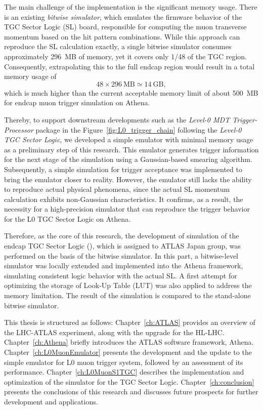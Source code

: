 The main challenge of the implementation is the significant memory usage. There is an existing \textit{bitwise simulator}, which emulates the firmware behavior of the TGC Sector Logic (SL) board, responsible for computing the muon transverse momentum based on the hit pattern combinations. While this approach can reproduce the SL calculation exactly, a single bitwise simulator consumes approximately 296~MB of memory, yet it covers only 1/48 of the TGC region. Consequently, extrapolating this to the full endcap region would result in a total memory usage of
\[
48 \times 296~\text{MB} \simeq 14~\text{GB},
\]
which is much higher than the current acceptable memory limit of about 500~MB for endcap muon trigger simulation on Athena.

Thereby, to support downstream developments such as the \textit{Level-0 MDT Trigger-Processor} package in the Figure~\ref{fig:L0_trigger_chain} following the \textit{Level-0 TGC Sector Logic}, we developed a simple emulator with minimal memory usage as a preliminary step of this research. This emulator generates trigger information for the next stage of the simulation using a Gaussian-based smearing algorithm. Subsequently, a simple simulation for trigger acceptance was implemented to bring the emulator closer to reality. However, the emulator still lacks the ability to reproduce actual physical phenomena, since the actual SL momentum calculation exhibits non-Gaussian characteristics. It confirms, as a result, the necessity for a high-precision simulator that can reproduce the trigger behavior for the L0 TGC Sector Logic on Athena.

Therefore, as the core of this research, the development of simulation of the endcap TGC Sector Logic (\SL), which is assigned to ATLAS Japan group, was performed on the basis of the bitwise simulator. In this part, a bitwise-level simulator was locally extended and implemented into the Athena framework, simulating consistent logic behavior with the actual SL. A first attempt for optimizing the storage of Look-Up Table (LUT) was also applied to address the memory limitation. The result of the simulation is compared to the stand-alone bitwise simulator.

This thesis is structured as follows: Chapter~\ref{ch:ATLAS} provides an overview of the LHC-ATLAS experiment, along with the upgrade for the HL-LHC. Chapter~\ref{ch:Athena} briefly introduces the ATLAS software framework, Athena. Chapter~\ref{ch:L0MuonEmulator} presents the development and the update to the simple emulator for L0 muon trigger system, followed by an assessment of its performance. Chapter~\ref{ch:L0MuonS1TGC} describes the implementation and optimization of the simulator for the TGC Sector Logic. Chapter~\ref{ch:conclusion} presents the conclusions of this research and discusses future prospects for further development and applications.